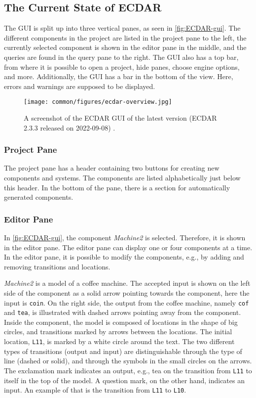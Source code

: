 \subsection{The Current State of ECDAR}\label{sub:the-current-state-of-ecdar} %

The GUI is split up into three vertical panes, as seen in \autoref{fig:ECDAR-gui}. The different components in the project are listed in the project pane to the left, the currently selected component is shown in the editor pane in the middle, and the queries are found in the query pane to the right.
The GUI also has a top bar, from where it is possible to open a project, hide panes, choose engine options, and more.  
Additionally, the GUI has a bar in the bottom of the view. Here, errors and warnings are supposed to be displayed.

\begin{figure}[H]
    \centering
    \texttt{[image: common/figures/ecdar-overview.jpg]}
    \caption{A screenshot of the ECDAR GUI of the latest version (ECDAR 2.3.3 released on 2022-09-08) \cite{ECDARNETreleasenotes}.}
    \label{fig:ECDAR-gui}
\end{figure}

\subsubsection{Project Pane}
The project pane has a header containing two buttons for creating new components and systems. The components are listed alphabetically just below this header. 
In the bottom of the pane, there is a section for automatically generated components.

\subsubsection{Editor Pane}
In \autoref{fig:ECDAR-gui}, the component \textit{Machine2} is selected. Therefore, it is shown in the editor pane. The editor pane can display one or four components at a time.
In the editor pane, it is possible to modify the components, e.g., by adding and removing transitions and locations.


\textit{Machine2} is a model of a coffee machine. The accepted input is shown on the left side of the component as a solid arrow pointing towards the component, here the input is \texttt{coin}. On the right side, the output from the coffee machine, namely \texttt{cof} and \texttt{tea}, is illustrated with dashed arrows pointing away from the component. 
Inside the component, the model is composed of locations in the shape of big circles, and transitions marked by arrows between the locations. The initial location, \texttt{L11}, is marked by a white circle around the text.
The two different types of transitions (output and input) are distinguishable through the type of line (dashed or solid), and through the symbols in the small circles on the arrows. The exclamation mark indicates an output, e.g., tea on the transition from \texttt{L11} to itself in the top of the model. A question mark, on the other hand, indicates an input. An example of that is the transition from \texttt{L11} to \texttt{L10}.

